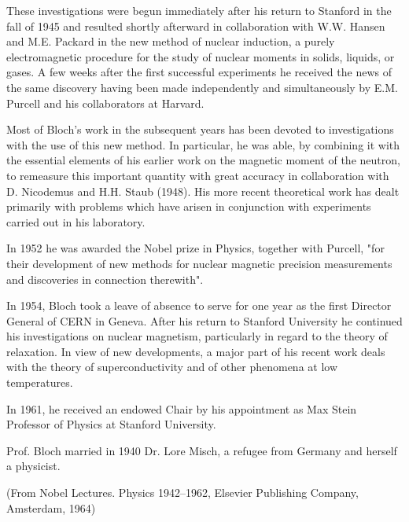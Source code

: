 These investigations were begun immediately after his return to Stanford in the fall of 1945 and resulted shortly afterward in collaboration with W.W. Hansen and M.E. Packard in the new method of nuclear induction, a purely electromagnetic procedure for the study of nuclear moments in solids, liquids, or gases. A few weeks after the first successful experiments he received the news of the same discovery having been made independently and simultaneously by E.M. Purcell and his collaborators at Harvard.
 
Most of Bloch's work in the subsequent years has been devoted to investigations with the use of this new method. In particular, he was able, by combining it with the essential elements of his earlier work on the magnetic moment of the neutron, to remeasure this important quantity with great accuracy in collaboration with D. Nicodemus and H.H. Staub (1948). His more recent theoretical work has dealt primarily with problems which have arisen in conjunction with experiments carried out in his laboratory.

In 1952 he was awarded the Nobel prize in Physics, together with Purcell, "for their development of new methods for nuclear magnetic precision measurements and discoveries in connection therewith".
 
In 1954, Bloch took a leave of absence to serve for one year as the first Director General of CERN in Geneva. After his return to Stanford University he continued his investigations on nuclear magnetism, particularly in regard to the theory of relaxation. In view of new developments, a major part of his recent work deals with the theory of superconductivity and of other phenomena at low temperatures.
 
In 1961, he received an endowed Chair by his appointment as Max Stein Professor of Physics at Stanford University.
 
Prof. Bloch married in 1940 Dr. Lore Misch, a refugee from Germany and herself a physicist.

(From Nobel Lectures. Physics 1942--1962, Elsevier Publishing Company, Amsterdam, 1964)

